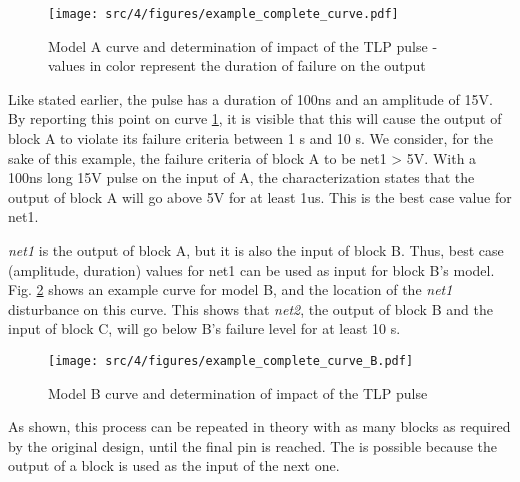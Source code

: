 \begin{figure}[!h]
  \centering
  \texttt{[image: src/4/figures/example\_complete\_curve.pdf]}
  \caption{Model A curve and determination of impact of the TLP pulse - values in color represent the duration of failure on the output}
  \label{example_complete_curve}
\end{figure}

Like stated earlier, the pulse has a duration of 100ns and an amplitude of 15V. By reporting this point on curve \ref{example_complete_curve},
it is visible that this will cause the output of block A to violate its failure criteria between 1 \textmugreek{}s and 10 \textmugreek{}s.
We consider, for the sake of this example, the failure criteria of block A to be net1 > 5V.
With a 100ns long 15V pulse on the input of A, the characterization states that the output of block A will go above 5V for at least 1us.
This is the best case value for net1.

\textit{net1} is the output of block A, but it is also the input of block B.
Thus, best case (amplitude, duration) values for net1 can be used as input for block B's model.
Fig. \ref{example_complete_curve_B} shows an example curve for model B, and the location of the \textit{net1} disturbance on this curve.
This shows that \textit{net2}, the output of block B and the input of block C, will go below B's failure level for at least 10 \textmugreek{}s.

\begin{figure}[!h]
  \centering
  \texttt{[image: src/4/figures/example\_complete\_curve\_B.pdf]}
  \caption{Model B curve and determination of impact of the TLP pulse}
  \label{example_complete_curve_B}
\end{figure}

As shown, this process can be repeated in theory with as many blocks as required by the original design, until the final pin is reached.
The is possible because the output of a block is used as the input of the next one.



